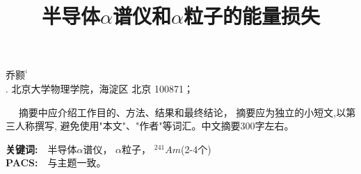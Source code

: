 \documentclass[a4paper,10.0pt,twoside]{npr}
\begin{document}
\setcounter{page}{001}%
\begin{center}
\title{%
\xiaoerhao \bf  %
半导体$\alpha$谱仪和$\alpha$粒子的能量损失\\[-5mm]}
\maketitle
\large \fs
乔颢$^{^1}$\\[2mm]

\xiaowu {}. 北京大学物理学院，海淀区 北京 100871；\\[4mm]

 

\parbox{158mm} {
~~\fs
摘要中应介绍工作目的、方法、结果和最终结论，
摘要应为独立的小短文,以第三人称撰写, 避免使用"本文"、"作者"等词汇。中文摘要300字左右。

{\bf 关键词:}~~\fs 半导体$\alpha$谱仪， $\alpha$粒子， $^{241}Am$(2-4个) \\
{\bf PACS:}~~\song 与主题一致。}
\end{center}
\vspace{5mm}
\setcounter{section}{0}
\end{document}
